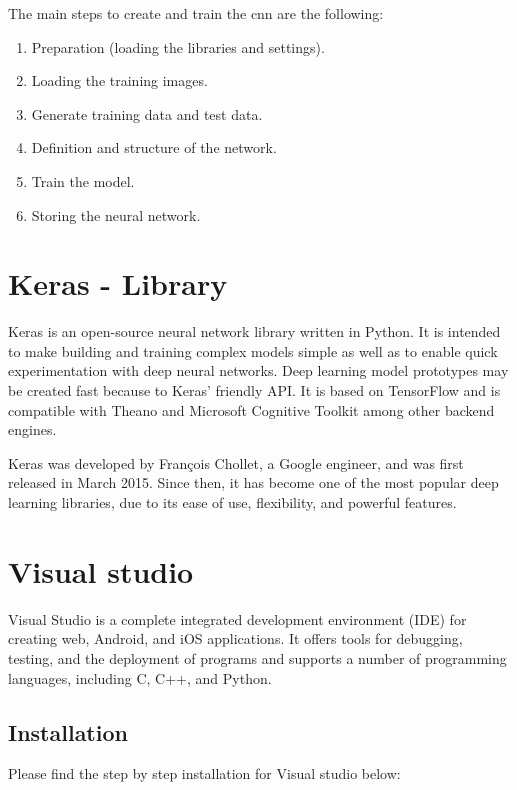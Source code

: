 The main steps to create and train the \ac{cnn} are the following:  
\begin{enumerate}
	\item Preparation (loading the libraries and settings).
	\item Loading the training images.
	\item Generate training data and test data.
	\item Definition and structure of the network.
	\item Train the model.
	\item Storing the neural network.
\end{enumerate}


\section{Keras - Library}

Keras is an open-source neural network library written in Python. It is intended to make building and training complex models simple as well as to enable quick experimentation with deep neural networks. Deep learning model prototypes may be created fast because to Keras' friendly API. It is based on TensorFlow and is compatible with Theano and Microsoft Cognitive Toolkit among other backend engines. \cite{Chollet:2015}

\bigskip

Keras was developed by François Chollet, a Google engineer, and was first released in March 2015. Since then, it has become one of the most popular deep learning libraries, due to its ease of use, flexibility, and powerful features.

\section{Visual studio}

Visual Studio is a complete integrated development environment (IDE) for creating web, Android, and iOS applications. It offers tools for debugging, testing, and the deployment of programs and supports a number of programming languages, including C, C++, and Python.

\bigskip

\subsection{Installation}

Please find the step by step installation for Visual studio below:

